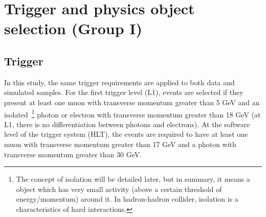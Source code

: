 
\section{Trigger and physics object selection (Group I)}

\subsection{Trigger}
\label{sec:trigger}

In this study, the same trigger requirements are applied to both data and simulated samples. For the first trigger level (L1), events are selected if they present at least one muon with transverse momentum greater than 5 GeV and an isolated~\footnote{The concept of isolation will be detailed later, but in summary, it means a object which has very small activity (above a certain threshold of energy/momentum) around it. In hadron-hadron collider, isolation is a characteristics of hard interactions.} photon or electron with transverse momentum greater than 18 GeV (at L1, there is no differentiation between photons and electrons). At the software level of the trigger system (HLT), the events are required to have at least one muon with transverse momentum greater than 17 GeV and a photon with transverse momentum greater than 30 GeV.

